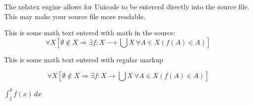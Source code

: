 \documentclass[12pt]{article}
\begin{document}
\thispagestyle{empty}

The xelatex engine allows for Unicode to be entererd directly into the
source file.  This may make your source file more readable.

This is some math text entered with math in the source:
\[
∀X [ ∅ ∉ X ⇒ ∃f:X ⟶  ⋃ X\ ∀A ∈ X (f(A) ∈ A ) ]\]

This is some math text entered with regular markup

\[
\forall X [\emptyset \not\in X \Rightarrow \exists f:X \rightarrow  \bigcup X\ 
    \forall A \in X (f(A) \in A ) ]\]

$∫_ξ^θ f(x)\,dx$


\end{document}
